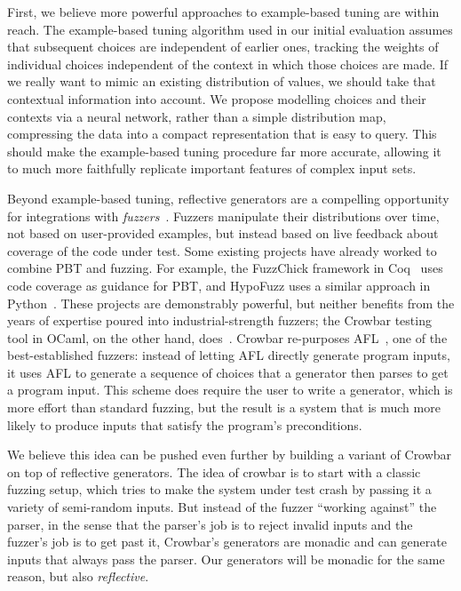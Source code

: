 First, we believe more powerful approaches to example-based tuning are
within reach.  The
example-based tuning algorithm used in
our initial evaluation assumes
that subsequent choices are
independent of earlier ones, tracking the weights of individual
choices independent of the
context in which those choices are made. If we really want to mimic an existing
distribution of values, we should take that contextual information into
account. We propose modelling choices and their contexts via a neural network,
rather than a simple distribution map, compressing the data into a compact
representation that is easy to query.
This should make the example-based tuning
procedure far more accurate, allowing it to much more faithfully replicate
important features of complex input sets.

Beyond example-based tuning, reflective generators are a compelling opportunity
for integrations with
{\em fuzzers}~\cn {}. Fuzzers manipulate their distributions over time, not based on
user-provided examples, but instead based on live feedback about coverage of the
code under test.
Some existing projects have already worked to
combine PBT and fuzzing.
For example, the FuzzChick framework in Coq~\cite{DBLP:journals/pacmpl/Lampropoulos0P19}
uses code coverage as guidance for PBT, and HypoFuzz uses a
similar approach in Python~\cite{hatfield-dodds_hypofuzz_nodate}. These projects
are demonstrably powerful, but neither benefits from the years of expertise
poured into industrial-strength fuzzers; the Crowbar testing tool in
OCaml, on the other hand,
does~\cite{dolan2017testing}. Crowbar re-purposes
AFL~\cite{afl-readme}, one of the best-established
fuzzers: instead of letting AFL directly generate program inputs, it
uses AFL
to generate a sequence of choices that a generator then parses to get a program input.
This scheme
does require the user to write a generator, which is more effort
than standard fuzzing, but the result is a system that is much more likely
to produce inputs that satisfy the program's preconditions.

We believe this idea can be pushed even further by building
a variant of Crowbar on top of reflective generators.
The idea of crowbar is to start with a classic fuzzing setup, which tries to make the
system under test
crash by passing it a variety of semi-random inputs. But instead of
the fuzzer
``working against'' the parser, in the sense that the parser's job is to reject
invalid inputs and the fuzzer's job is to get past it, Crowbar's generators are
monadic and can generate
inputs that always pass the parser. Our generators will be monadic for the same
reason, but also {\em reflective}.

